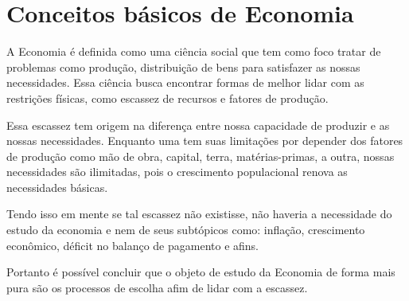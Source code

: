 \section{Conceitos básicos de Economia}
A Economia é definida como uma ciência social que tem como foco tratar de problemas como produção, distribuição de bens para satisfazer as nossas necessidades. Essa ciência busca encontrar formas de melhor lidar com as restrições físicas, como escassez de recursos e fatores de produção.\par
Essa escassez tem origem na diferença entre nossa capacidade de produzir e as nossas necessidades. Enquanto uma tem suas limitações por depender dos fatores de produção como mão de obra, capital, terra, matérias-primas,\citep{emm} a outra, nossas necessidades são ilimitadas, pois o crescimento populacional renova as necessidades básicas.\par
Tendo isso em mente se tal escassez não existisse, não haveria a necessidade do estudo da economia e nem de seus subtópicos como: inflação, crescimento econômico, déficit no balanço de pagamento e afins.\citep{emm}\par	
Portanto é possível concluir que o objeto de estudo da Economia de forma mais pura são os processos de escolha afim de lidar com a escassez.
\clearpage